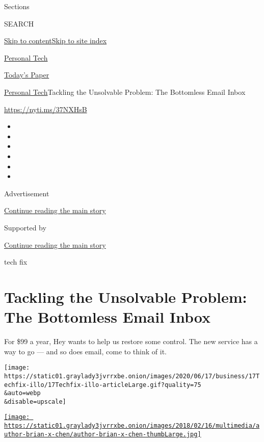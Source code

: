 Sections

SEARCH

\protect\hyperlink{site-content}{Skip to
content}\protect\hyperlink{site-index}{Skip to site index}

\href{https://www.nytimes3xbfgragh.onion/section/technology/personaltech}{Personal
Tech}

\href{https://myaccount.nytimes3xbfgragh.onion/auth/login?response_type=cookie\&client_id=vi}{}

\href{https://www.nytimes3xbfgragh.onion/section/todayspaper}{Today's
Paper}

\href{/section/technology/personaltech}{Personal Tech}\textbar{}Tackling
the Unsolvable Problem: The Bottomless Email Inbox

\href{https://nyti.ms/37NXHsB}{https://nyti.ms/37NXHsB}

\begin{itemize}
\item
\item
\item
\item
\item
\item
\end{itemize}

Advertisement

\protect\hyperlink{after-top}{Continue reading the main story}

Supported by

\protect\hyperlink{after-sponsor}{Continue reading the main story}

tech fix

\hypertarget{tackling-the-unsolvable-problem-the-bottomless-email-inbox}{%
\section{Tackling the Unsolvable Problem: The Bottomless Email
Inbox}\label{tackling-the-unsolvable-problem-the-bottomless-email-inbox}}

For \$99 a year, Hey wants to help us restore some control. The new
service has a way to go --- and so does email, come to think of it.

\texttt{[image: https://static01.graylady3jvrrxbe.onion/images/2020/06/17/business/17Techfix-illo/17Techfix-illo-articleLarge.gif?quality=75\\\&auto=webp\\\&disable=upscale]}

\href{https://www.nytimes3xbfgragh.onion/by/brian-x-chen}{\texttt{[image: https://static01.graylady3jvrrxbe.onion/images/2018/02/16/multimedia/author-brian-x-chen/author-brian-x-chen-thumbLarge.jpg]}}


